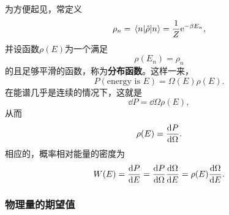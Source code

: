 \documentclass[hyperref, UTF8, a4paper]{ctexart}
\newcommand*{\ee}{\mathrm{e}}
\begin{document}
为方便起见，常定义
\begin{equation}
    \rho_n = \mel{n}{\hat{\rho}}{n} = \frac{1}{Z} \ee^{-\beta E_n},
\end{equation}
并设函数$\rho(E)$为一个满足
\begin{equation}
    \rho(E_n) = \rho_n
\end{equation}
的且足够平滑的函数，称为\textbf{分布函数}。这样一来，
\begin{equation}
    P(\text{energy is $E$}) = \Omega(E) \rho(E).
\end{equation}
在能谱几乎是连续的情况下，这就是
\[
    \dd{P} = \dd{\Omega} \rho(E),
\]
从而
\begin{equation}
    \rho(E) = \dv{P}{\Omega}.
\end{equation}
相应的，概率相对能量的密度为
\begin{equation}
    W(E) = \dv{P}{E} = \dv{P}{\Omega} \dv{\Omega}{E} = \rho(E) \dv{\Omega}{E}.
    \label{eq:canonical-ensemble-probablity-density}
\end{equation}

\subsubsection{物理量的期望值}
\end{document}
